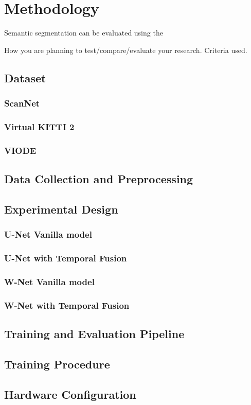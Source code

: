 

    \chapter{Methodology}
	\label{chap:methodology}
	
	Semantic segmentation can be evaluated using the 
	
    How you are planning to test/compare/evaluate your research.
    Criteria used.

    \section{Dataset}
    \subsection{ScanNet}
    \subsection{Virtual KITTI 2}
    \subsection{VIODE}
	
	\section{Data Collection and Preprocessing}
    \section{Experimental Design}
    \subsection{U-Net Vanilla model}
    \subsection{U-Net with Temporal Fusion}
    \subsection{W-Net Vanilla model}
    \subsection{W-Net with Temporal Fusion}
    \section{Training and Evaluation Pipeline}
    \section{Training Procedure}
    \section{Hardware Configuration}
    

